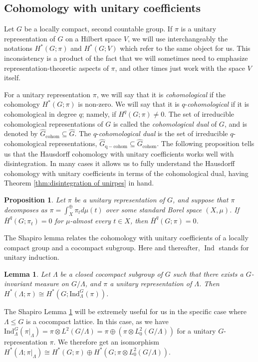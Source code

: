 \documentclass[12pt,reqno]{amsart}
\newtheorem{lemma}[theorem]{Lemma}
\newtheorem{proposition}[theorem]{Proposition}
\theoremstyle{definition}
\newcommand{\Ind}{\operatorname{Ind}}
\begin{document}
\subsection{Cohomology with unitary coefficients} \label{subsec:Cohomology with unitary coefficients}
Let $G$ be a locally compact, second countable group. 
If $\pi$ is a unitary representation of $G$ on a Hilbert space $V$, we will use interchangeably the notations $H^*(G;\pi)$ and $H^*(G;V)$ which refer to the same object for us. This inconsistency is a product of the fact that we will sometimes need to emphasize representation-theoretic aspects of $\pi$, and other times just work with the space $V$ itself.

For a unitary representation $\pi$, we will say that it is \emph{cohomological} if the cohomology $H^*(G;\pi)$ is non-zero. We will say that it is $q$-\emph{cohomological} if it is cohomological in degree $q$; namely, if $H^q(G;\pi) \ne 0$. The set of irreducible cohomological representations of $G$ is called the \emph{cohomological dual} of $G$, and is denoted by $\widehat{G}_{\mathrm{cohom}} \subseteq \widehat{G}$. The $q$-\emph{cohomological dual} is the set of irreducible $q$-cohomological representations, $\widehat{G}_{\mathrm{q-cohom}} \subseteq \widehat{G}_{\mathrm{cohom}}$. The following proposition tells us that the Hausdorff cohomology with unitary coefficients works well with disintegration. In many cases it allows us to fully understand the Hausdorff cohomology with unitary coefficients in terms of the cohomological dual, having Theorem \ref{thm:disintegration of unirpes} in hand.
\begin{proposition}\cite[Theorem~7.2]{Blanc}\label{prop:red cohom direct integral}
    Let $\pi$ be a unitary representation of $G$, and suppose that $\pi$ decomposes as $\pi=\int_X^{\oplus}\pi_td\mu(t)$ over some standard Borel space $(X, \mu)$. If $\bar{H}^q(G;\pi_t)=0$ for $\mu$-almost every $t \in X$, then $\bar{H}^q(G;\pi)=0$.
\end{proposition}

The Shapiro lemma relates the cohomology with unitary coefficients of a locally compact group and a cocompact subgroup. Here and thereafter, $\Ind$ stands for unitary induction.
\begin{lemma}\cite[Theorem~8.8]{Blanc}\label{lem: shapiro lemma}
    Let $\Lambda$ be a closed cocompact subgroup of $G$ such that there exists a $G$-invariant measure on $G / \Lambda$, and $\pi$ a unitary representation of $\Lambda$. Then $H^*(\Lambda;\pi) \cong H^*(G;\mathrm{Ind}_\Lambda^G(\pi))$.
\end{lemma}
The Shapiro Lemma \ref{lem: shapiro lemma} will be extremely useful for us in the specific case where $\Lambda \leq G$ is a cocompact lattice. In this case, as we have $\mathrm{Ind}_\Lambda^G(\pi|_{\Lambda})=\pi \otimes L^2(G / \Lambda)=\pi \oplus (\pi \otimes L^2_0(G/\Lambda))$ for a unitary $G$-representation $\pi$. We therefore get an isomorphism $H^*(\Lambda;\pi|_{\Lambda}) \cong H^*(G;\pi) \oplus H^*(G;\pi \otimes L^2_0(G/\Lambda))$. 
\end{document}
